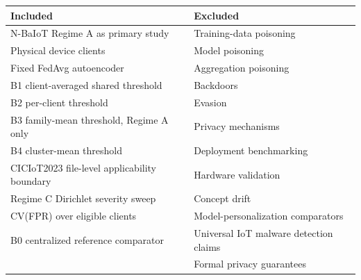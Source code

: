 \vspace{0.2em}
\begin{tabularx}{\linewidth}{@{} >{\small}X >{\small}X @{}}
\toprule
\textbf{Included} & \textbf{Excluded}\\
\midrule
N-BaIoT Regime A as primary study        & Training-data poisoning\\[2pt]
Physical device clients                  & Model poisoning\\[2pt]
Fixed FedAvg autoencoder                 & Aggregation poisoning\\[2pt]
B1 client-averaged shared threshold      & Backdoors\\[2pt]
B2 per-client threshold                  & Evasion\\[2pt]
B3 family-mean threshold, Regime A only  & Privacy mechanisms\\[2pt]
B4 cluster-mean threshold                & Deployment benchmarking\\[2pt]
CICIoT2023 file-level applicability boundary & Hardware validation\\[2pt]
Regime C Dirichlet severity sweep        & Concept drift\\[2pt]
CV(FPR) over eligible clients            & Model-personalization comparators\\[2pt]
B0 centralized reference comparator      & Universal IoT malware detection claims\\[2pt]
                                          & Formal privacy guarantees\\
\bottomrule
\end{tabularx}

\clearpage
